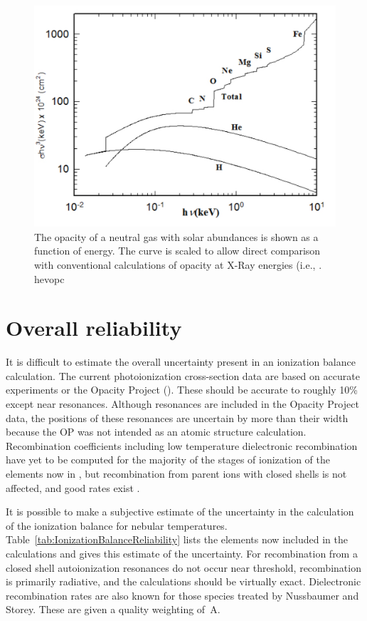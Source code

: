 \begin{figure}
\centering
\label{fig:GasOpacity}
\includegraphics[scale=0.7]{GasOpacity}
\caption[Atomic gas opacity]{The opacity of a neutral gas with solar abundances is shown
as a function of energy.  The curve is scaled to allow direct comparison
with conventional calculations of opacity at X-Ray energies (i.e., \citet{Morrison1983}. hevopc}
\end{figure}

\section{Overall reliability}

It is difficult to estimate the overall uncertainty present in an
ionization balance calculation.  The current photoionization cross-section
data are based on accurate experiments or the Opacity Project (\citealp{VernerFerlandKorista1996}).  These should be accurate to roughly 10\% except near resonances.
Although resonances are included in the Opacity Project data, the positions
of these resonances are uncertain by more than their width because the OP
was not intended as an atomic structure calculation.  Recombination
coefficients including low temperature dielectronic recombination have yet
to be computed for the majority of the stages of ionization of the elements
now in \Cloudy, but recombination from parent ions with closed shells is
not affected, and good rates exist \citep{VernerFerland1996}.

It is possible to make a subjective estimate of the uncertainty in the
calculation of the ionization balance for nebular temperatures.
Table~\ref{tab:IonizationBalanceReliability}
lists the elements now included in the calculations and gives this estimate
of the uncertainty.  For recombination from a closed shell autoionization
resonances do not occur near threshold, recombination is primarily radiative,
and the calculations should be virtually exact.  Dielectronic recombination
rates are also known for those species treated by
Nussbaumer and Storey.
These are given a quality weighting of~A.

